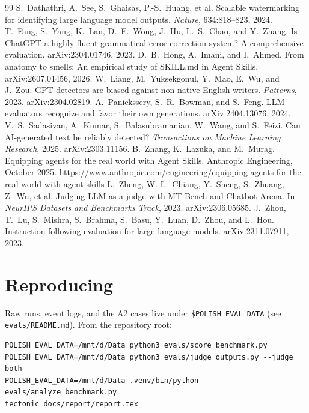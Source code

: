 \documentclass[11pt]{article}
\newcommand{\code}[1]{\texttt{#1}}
\begin{document}
\begin{thebibliography}{99}\small
{} S.~Dathathri, A.~See, S.~Ghaisas, P.-S.~Huang, et al.
  Scalable watermarking for identifying large language model outputs.
  \emph{Nature}, 634:818--823, 2024.
 T.~Fang, S.~Yang, K.~Lan, D.~F.~Wong, J.~Hu, L.~S.~Chao, and Y.~Zhang.
  Is ChatGPT a highly fluent grammatical error correction system? A comprehensive
  evaluation. arXiv:2304.01746, 2023.
 D.~B.~Hong, A.~Imani, and I.~Ahmed.
  From anatomy to smells: An empirical study of SKILL.md in Agent Skills.
  arXiv:2607.01456, 2026.
 W.~Liang, M.~Yuksekgonul, Y.~Mao, E.~Wu, and J.~Zou.
  GPT detectors are biased against non-native English writers.
  \emph{Patterns}, 2023. arXiv:2304.02819.
 A.~Panickssery, S.~R.~Bowman, and S.~Feng.
  LLM evaluators recognize and favor their own generations. arXiv:2404.13076, 2024.
 V.~S.~Sadasivan, A.~Kumar, S.~Balasubramanian, W.~Wang, and
  S.~Feizi. Can AI-generated text be reliably detected?
  \emph{Transactions on Machine Learning Research}, 2025. arXiv:2303.11156.
 B.~Zhang, K.~Lazuka, and M.~Murag.
  Equipping agents for the real world with Agent Skills. Anthropic Engineering, October
  2025. \url{https://www.anthropic.com/engineering/equipping-agents-for-the-real-world-with-agent-skills}
 L.~Zheng, W.-L.~Chiang, Y.~Sheng, S.~Zhuang, Z.~Wu, et al.
  Judging LLM-as-a-judge with MT-Bench and Chatbot Arena.
  In \emph{NeurIPS Datasets and Benchmarks Track}, 2023. arXiv:2306.05685.
 J.~Zhou, T.~Lu, S.~Mishra, S.~Brahma, S.~Basu, Y.~Luan, D.~Zhou,
  and L.~Hou. Instruction-following evaluation for large language models.
  arXiv:2311.07911, 2023.
\end{thebibliography}

\appendix
\section{Reproducing}

Raw runs, event logs, and the A2 cases live under \code{\$POLISH\_EVAL\_DATA} (see
\code{evals/README.md}). From the repository root:

\begin{verbatim}
POLISH_EVAL_DATA=/mnt/d/Data python3 evals/score_benchmark.py
POLISH_EVAL_DATA=/mnt/d/Data python3 evals/judge_outputs.py --judge both
POLISH_EVAL_DATA=/mnt/d/Data .venv/bin/python evals/analyze_benchmark.py
tectonic docs/report/report.tex
\end{verbatim}
\end{document}
